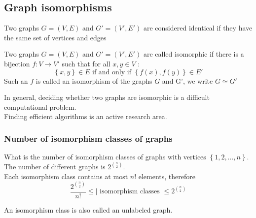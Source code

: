 \documentclass[../main.tex]{subfiles}
\begin{document}
\subsection{Graph isomorphisms}
Two graphs $G= (V,E)$ and $G'= ( V',E') $ are considered identical if they have the same set of vertices and edges
	
\begin{defn}
	Two graphs $G=( V,E) $ and $G'=( V',E') $ are called isomorphic if there is a bijection $f : V \to V'$ such that for all $x, y \in V$ :
	\[ 
		\left\{ x,y \right\} \in E \text{ if and only if }   \left\{ f( x) ,f( y)  \right\} \in E'
	\]
	Such an $f$ is called an isomorphism of the graphs $G$ and G', we write $G \simeq G'$
\end{defn}
\begin{rmq}
In general, deciding whether two graphs are isomorphic is a difficult computational problem.\\
Finding efficient algorithms is an active research area.
\end{rmq}
\subsubsection{Number of isomorphism classes of graphs}
What is the number of isomorphism classes of graphs with vertices $ \left\{ 1,2,\ldots, n \right\} $.\\
The number of different graphs is $2^{ \binom n 2}$.\\
Each isomorphism class contains at most $n!$ elements, therefore
\[ 
\frac{2^{ \binom n 2}}{n!} \leq  | \text{ isomorphism classes } \leq  2^{ \binom n 2}
\]
\begin{rmq}
An isomorphism class is also called an unlabeled graph.
\end{rmq}
\end{document}
